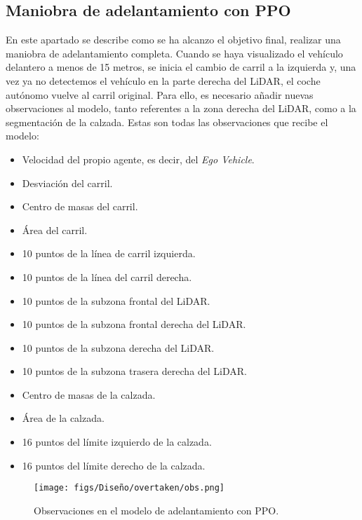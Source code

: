 \subsection{Maniobra de adelantamiento con PPO}

En este apartado se describe como se ha alcanzo el objetivo final, realizar una maniobra de adelantamiento completa. Cuando se haya visualizado el vehículo delantero a menos de 15 metros, se inicia el cambio de carril a la izquierda y, una vez ya no detectemos el vehículo en la parte derecha del \ac{LiDAR}, el coche autónomo vuelve al carril original. Para ello, es necesario añadir nuevas observaciones al modelo, tanto referentes a la zona derecha del \ac{LiDAR}, como a la segmentación de la calzada. Estas son todas las observaciones que recibe el modelo:
\begin{itemize}
\item Velocidad del propio agente, es decir, del \textit{Ego Vehicle}.
\item Desviación del carril.
\item Centro de masas del carril.
\item Área del carril.
\item 10 puntos de la línea de carril izquierda.
\item 10 puntos de la línea del carril derecha.
\item 10 puntos de la subzona frontal del \ac{LiDAR}.
\item 10 puntos de la subzona frontal derecha del \ac{LiDAR}.
\item 10 puntos de la subzona derecha del \ac{LiDAR}.
\item 10 puntos de la subzona trasera derecha del \ac{LiDAR}.
\item Centro de masas de la calzada.
\item Área de la calzada.
\item 16 puntos del límite izquierdo de la calzada.
\item 16 puntos del límite derecho de la calzada.
\end{itemize}

\begin{figure}[ht]
  \centering
  \texttt{[image: figs/Diseño/overtaken/obs.png]}
  \caption{Observaciones en el modelo de adelantamiento con \ac{PPO}.}
  \label{fig:obs_overtaken}
\end{figure}

\newpage

